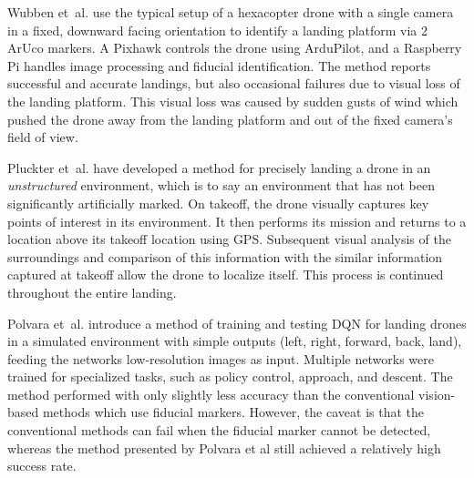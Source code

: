 Wubben et~al.\@ \cite{accurate_landing_UAV_ground_pattern} use the typical setup of a hexacopter drone with a single camera in a fixed, downward facing orientation to identify a landing platform via 2 ArUco markers. A Pixhawk controls the drone using ArduPilot, and a Raspberry Pi handles image processing and fiducial identification. The method reports successful and accurate landings, but also occasional failures due to visual loss of the landing platform. This visual loss was caused by sudden gusts of wind which pushed the drone away from the landing platform and out of the fixed camera's field of view.

Pluckter et~al.\@ \cite{drone_landing_unstructured_environments} have developed a method for precisely landing a drone in an \textit{unstructured} environment, which is to say an environment that has not been significantly artificially marked. On takeoff, the drone visually captures key points of interest in its environment. It then performs its mission and returns to a location above its takeoff location using \gls{GPS}. Subsequent visual analysis of the surroundings and comparison of this information with the similar information captured at takeoff allow the drone to localize itself. This process is continued throughout the entire landing.

Polvara et~al.\@ \cite{drq_landing} introduce a method of training and testing \gls{DQN} for landing drones in a simulated environment with simple outputs (left, right, forward, back, land), feeding the networks low-resolution images as input. Multiple networks were trained for specialized tasks, such as policy control, approach, and descent. The method performed with only slightly less accuracy than the conventional vision-based methods which use fiducial markers. However, the caveat is that the conventional methods can fail when the fiducial marker cannot be detected, whereas the method presented by Polvara et al still achieved a relatively high success rate.

